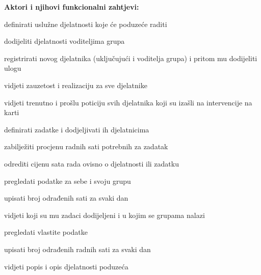 			\noindent \textbf{Aktori i njihovi funkcionalni zahtjevi:}
			\begin{packed_enum}
				\item  {}
				
				\begin{packed_enum}
					\item definirati uslužne djelatnosti koje će poduzeće raditi
					\item dodijeliti djelatnosti voditeljima grupa
					\item registrirati novog djelatnika (uključujući i voditelja grupa) i pritom mu dodijeliti ulogu
					\item vidjeti zauzetost i realizaciju za sve djelatnike
					\item vidjeti trenutno i prošlu poticiju svih djelatnika koji su izašli na intervencije na karti
				\end{packed_enum}
			
				\item  {}
				
				\begin{packed_enum}
					\item definirati zadatke i dodjeljivati ih djelatnicima
					\item zabilježiti procjenu radnih sati potrebnih za zadatak
					\item odrediti cijenu sata rada ovisno o djelatnosti ili zadatku
					\item pregledati podatke za sebe i svoju grupu
					\item upisati broj odrađenih sati za svaki dan
				\end{packed_enum}
				\eject
				\item  {}
				\begin{packed_enum}
					\item vidjeti koji su mu zadaci dodijeljeni i u kojim se grupama nalazi
					\item pregledati vlastite podatke
					\item upisati broj odrađenih radnih sati za svaki dan
				\end{packed_enum}
			
			\item  {}
			\begin{packed_enum}
				\item vidjeti popis i opis djelatnosti poduzeća
			\end{packed_enum}
			\end{packed_enum}
			
